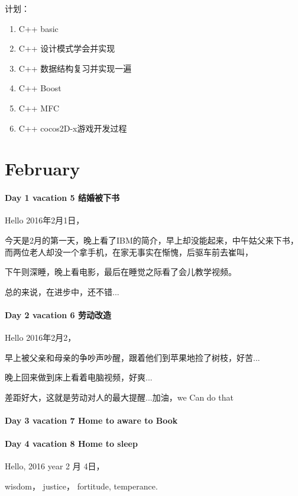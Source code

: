 \documentclass[UTF8,a4paper,8pt]{ctexbook}
\begin{document}
		 计划：
		 \begin{enumerate}[fullwidth,itemindent = 2em]
		 	\item  C++ basic
		 	\item  C++ 设计模式学会并实现
		 	\item  C++ 数据结构复习并实现一遍
		 	\item  C++ Boost
		 	\item  C++ MFC
		 	\item  C++ cocos2D-x游戏开发过程
		 \end{enumerate}
 
 
 \newpage
 \section*{February}
 
 	 \paragraph{Day 1   vacation 5    \quad  结婚被下书  }
	 	 Hello 2016年2月1日，
	 	 
	 	 今天是2月的第一天，晚上看了IBM的简介，早上却没能起来，中午姑父来下书，而两位老人却没一个拿手机，在家无事实在惭愧，后驱车前去崔叫，
	 	 
	 	 下午则深睡，晚上看电影，最后在睡觉之际看了会儿教学视频。
	 	 
	 	 总的来说，在进步中，还不错...
 	 \paragraph{Day 2   vacation 6    \quad  劳动改造   }
	 	 Hello 2016年2月2，
	 	 
	 	 早上被父亲和母亲的争吵声吵醒，跟着他们到苹果地捡了树枝，好苦...
	 	 
	 	 晚上回来做到床上看着电脑视频，好爽...
	 	 
	 	 差距好大，这就是劳动对人的最大提醒...加油，we Can do that
 	 \paragraph{Day 3   vacation 7     \quad   Home to aware to Book }
 	 \paragraph{Day 4   vacation 8     \quad   Home to sleep  }
	 	 Hello, 2016 year 2 月 4日，
	 	 
	 	 wisdom， justice， fortitude, temperance.
	 	 
\end{document}
